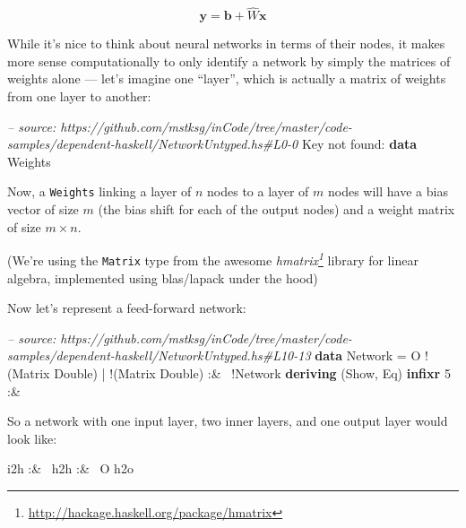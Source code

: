 \documentclass[]{article}
\newenvironment{Shaded}{}{}
\newcommand{\KeywordTok}[1]{\textcolor[rgb]{0.00,0.44,0.13}{\textbf{{#1}}}}
\newcommand{\DataTypeTok}[1]{\textcolor[rgb]{0.56,0.13,0.00}{{#1}}}
\newcommand{\DecValTok}[1]{\textcolor[rgb]{0.25,0.63,0.44}{{#1}}}
\newcommand{\CommentTok}[1]{\textcolor[rgb]{0.38,0.63,0.69}{\textit{{#1}}}}
\newcommand{\FunctionTok}[1]{\textcolor[rgb]{0.02,0.16,0.49}{{#1}}}
\newcommand{\NormalTok}[1]{{#1}}
\renewcommand{\href}[2]{#2\footnote{\url{#1}}}
\begin{document}
\[
\mathbf{y} = \mathbf{b} + \hat{W} \mathbf{x}
\]

While it's nice to think about neural networks in terms of their nodes,
it makes more sense computationally to only identify a network by simply
the matrices of weights alone --- let's imagine one ``layer'', which is
actually a matrix of weights from one layer to another:

\begin{Shaded}
\begin{Highlighting}[]
\CommentTok{-- source: https://github.com/mstksg/inCode/tree/master/code-samples/dependent-haskell/NetworkUntyped.hs#L0-0}
\DataTypeTok{Key} \NormalTok{not found}\FunctionTok{:} \KeywordTok{data} \DataTypeTok{Weights}
\end{Highlighting}
\end{Shaded}

Now, a \texttt{Weights} linking a layer of \(n\) nodes to a layer of
\(m\) nodes will have a bias vector of size \(m\) (the bias shift for
each of the output nodes) and a weight matrix of size \(m \times n\).

(We're using the \texttt{Matrix} type from the awesome
\emph{\href{http://hackage.haskell.org/package/hmatrix}{hmatrix}}
library for linear algebra, implemented using blas/lapack under the
hood)

Now let's represent a feed-forward network:

\begin{Shaded}
\begin{Highlighting}[]
\CommentTok{-- source: https://github.com/mstksg/inCode/tree/master/code-samples/dependent-haskell/NetworkUntyped.hs#L10-13}
\KeywordTok{data} \DataTypeTok{Network} \FunctionTok{=} \DataTypeTok{O} \FunctionTok{!}\NormalTok{(}\DataTypeTok{Matrix} \DataTypeTok{Double}\NormalTok{)}
             \FunctionTok{|} \FunctionTok{!}\NormalTok{(}\DataTypeTok{Matrix} \DataTypeTok{Double}\NormalTok{) }\FunctionTok{:&~} \FunctionTok{!}\DataTypeTok{Network}
  \KeywordTok{deriving} \NormalTok{(}\DataTypeTok{Show}\NormalTok{, }\DataTypeTok{Eq}\NormalTok{)}
\KeywordTok{infixr} \DecValTok{5} \FunctionTok{:&~}
\end{Highlighting}
\end{Shaded}

So a network with one input layer, two inner layers, and one output
layer would look like:

\begin{Shaded}
\begin{Highlighting}[]
\NormalTok{i2h }\FunctionTok{:&~} \NormalTok{h2h }\FunctionTok{:&~} \DataTypeTok{O} \NormalTok{h2o}
\end{Highlighting}
\end{Shaded}
\end{document}
